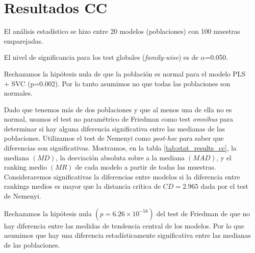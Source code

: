 \documentclass[a4paper,oneside,11pt,leqno]{article}
\begin{document}
	
	\section{Resultados CC}
	\label{sec:results_cc}
	
	El análisis estadístico se hizo entre 20 modelos (poblaciones) con 100 muestras emparejadas.
	
	El nivel de significancia para los test globales (\textit{family-wise}) es de $\alpha$=0.050.
	
	Rechazamos la hipótesis nula de que la población es normal para el modelo PLS + SVC (p=0.002). Por lo tanto asumimos no que todas las poblaciones son normales.
	
	Dado que tenemos más de dos poblaciones y que al menos una de ella no es normal, usamos el test no paramétrico de Friedman como test \textit{omnibus} para determinar si hay alguna diferencia significativa entre las medianas de las poblaciones. Utilizamos el test de Nemenyi como \textit{post-hoc} para saber que diferencias son significativas. Mostramos, en la tabla \ref{tab:stat_results_cc}, la mediana $(MD)$, la desviación absoluta sobre a la mediana $(MAD)$, y el ranking medio $(MR)$ de cada modelo a partir de todas las muestras. Consideraremos significativas la diferencias entre modelos si la diferencia entre rankings medios es mayor que la distancia crítica de $CD=2.965$ dada por el test de Nemenyi.

	Rechazamos la hipótesis nula $(p=6.26\times 10^{-58})$ del test de Friedman de que no hay diferencia entre las medidas de tendencia central de los modelos. Por lo que asumimos que hay una diferencia estadísticamente significativa entre las medianas de las poblaciones.
	
\end{document}
